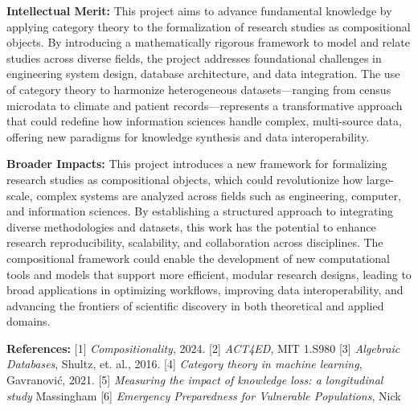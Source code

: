 \documentclass[11pt]{extarticle}
\begin{document}
\textbf{Intellectual Merit:} This project aims to advance fundamental knowledge by applying category theory to the formalization of research studies as compositional objects. 
By introducing a mathematically rigorous framework to model and relate studies across diverse fields, the project addresses foundational challenges in engineering system design, database architecture, and data integration. 
The use of category theory to harmonize heterogeneous datasets—ranging from census microdata to climate and patient records—represents a transformative approach that could redefine how information sciences handle complex, multi-source data, offering new paradigms for knowledge synthesis and data interoperability.

\textbf{Broader Impacts:} This project introduces a new framework for formalizing research studies as compositional objects, which could revolutionize how large-scale, complex systems are analyzed across fields such as engineering, computer, and information sciences. By establishing a structured approach to integrating diverse methodologies and datasets, this work has the potential to enhance research reproducibility, scalability, and collaboration across disciplines. The compositional framework could enable the development of new computational tools and models that support more efficient, modular research designs, leading to broad applications in optimizing workflows, improving data interoperability, and advancing the frontiers of scientific discovery in both theoretical and applied domains.

\textbf{References:} [1] \textit{Compositionality}, 2024. [2] \textit{ACT4ED}, MIT 1.S980 [3] \textit{Algebraic Databases}, Shultz, et. al., 2016. [4] \textit{Category theory in machine learning}, Gavranović, 2021. [5] \textit{Measuring the impact of knowledge loss: a longitudinal study} Massingham [6] \textit{Emergency Preparedness for Vulnerable Populations}, Nick
\end{document}
